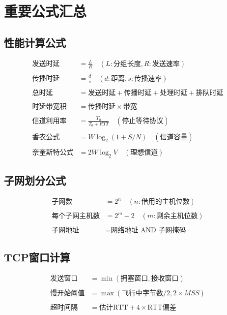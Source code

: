 \documentclass[lang=cn,newtx,10pt,scheme=chinese]{../../elegantbook}
\begin{document}
\begin{longtable}{@{}p{4cm}p{4cm}p{6cm}@{}}
\bottomrule
\end{longtable}

\section{重要公式汇总}
\subsection{性能计算公式}
\begin{align}
\text{发送时延} &= \frac{L}{R} \quad (L:\text{分组长度},R:\text{发送速率}) \\\\
\text{传播时延} &= \frac{d}{s} \quad (d:\text{距离},s:\text{传播速率}) \\\\
\text{总时延} &= \text{发送时延} + \text{传播时延} + \text{处理时延} + \text{排队时延} \\\\
\text{时延带宽积} &= \text{传播时延} \times \text{带宽} \\\\
\text{信道利用率} &= \frac{T_0}{T_0 + RTT} \quad (\text{停止等待协议}) \\\\
\text{香农公式} &= W \log_2(1 + S/N) \quad (\text{信道容量}) \\\\
\text{奈奎斯特公式} &= 2W \log_2 V \quad (\text{理想信道})
\end{align}

\subsection{子网划分公式}
\begin{align}
\text{子网数} &= 2^n \quad (n:\text{借用的主机位数}) \\\\
\text{每个子网主机数} &= 2^m - 2 \quad (m:\text{剩余主机位数}) \\\\
\text{子网地址} &= \text{网络地址} \text{ AND } \text{子网掩码}
\end{align}

\subsection{TCP窗口计算}
\begin{align}
\text{发送窗口} &= \min(\text{拥塞窗口}, \text{接收窗口}) \\\\
\text{慢开始阈值} &= \max(\text{飞行中字节数}/2, 2 \times MSS) \\\\
\text{超时间隔} &= \text{估计RTT} + 4 \times \text{RTT偏差}
\end{align}
\end{document}
